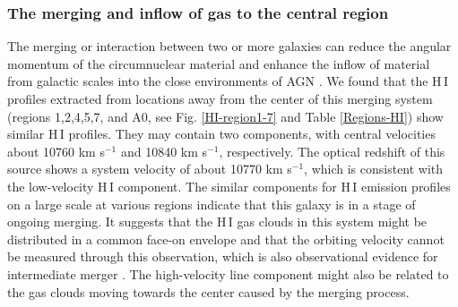 \documentclass[]{aa} %
\newcommand{\kms}{km s$^{-1}$\xspace}
\newcommand{\HI}{{\rm H\,{\scriptsize I}}\xspace}
\begin{document}
\subsubsection{The merging and inflow of gas to the central region}
The merging or interaction between two or more galaxies can reduce the angular momentum of the circumnuclear material and enhance the inflow of material from galactic scales into the close environments of AGN \citep{2021MNRAS.506.5935R,2005Natur.433..604D}.
We found that the \HI profiles extracted from locations away from the center of this merging system (regions 1,2,4,5,7, and A0, see Fig. \ref{HI-region1-7} and Table \ref{Regions-HI})  show similar \HI profiles.  They may contain two components, with central velocities about 10760 \kms and 10840 \kms, respectively.  The optical redshift of this source shows a system velocity of about 10770 \kms \citep[e.g.][]{2019MNRAS.489.1099D,1995ApJS...98..129K}, which is consistent with the low-velocity \HI component.
The similar components for \HI emission profiles on a large scale at various regions indicate that this galaxy is in a stage of ongoing merging.  It suggests that the \HI gas clouds in this system might be distributed in a common face-on envelope and that the orbiting velocity cannot be measured through this observation, which is also observational evidence for intermediate merger \citep[e.g.][]{2021MNRAS.506.5935R,2011AJ....141..100H}.
The high-velocity line component might also be related to the gas clouds moving towards the center caused by the merging process.


\end{document}

